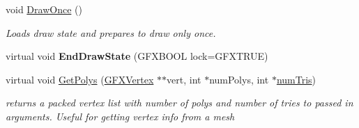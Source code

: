 \begin{DoxyCompactItemize}
\item 
void \hyperlink{classGFXVertexList_a965e59eb121d7ba4a0626cf9b5f0dcc1}{Draw\+Once} ()\hypertarget{classGFXVertexList_a965e59eb121d7ba4a0626cf9b5f0dcc1}{}\label{classGFXVertexList_a965e59eb121d7ba4a0626cf9b5f0dcc1}

\begin{DoxyCompactList}\small\item\em Loads draw state and prepares to draw only once. \end{DoxyCompactList}\item 
virtual void {\bfseries End\+Draw\+State} (G\+F\+X\+B\+O\+OL lock=G\+F\+X\+T\+R\+UE)\hypertarget{classGFXVertexList_a71b8f6132eb44a75a932ca7b6f55c547}{}\label{classGFXVertexList_a71b8f6132eb44a75a932ca7b6f55c547}

\item 
virtual void \hyperlink{classGFXVertexList_a59a08674ffc8cad57e0961b05110333e}{Get\+Polys} (\hyperlink{structGFXVertex}{G\+F\+X\+Vertex} $\ast$$\ast$vert, int $\ast$num\+Polys, int $\ast$\hyperlink{classGFXVertexList_af0ca7d06410f649c6d1d506121c4f6da}{num\+Tris})\hypertarget{classGFXVertexList_a59a08674ffc8cad57e0961b05110333e}{}\label{classGFXVertexList_a59a08674ffc8cad57e0961b05110333e}

\begin{DoxyCompactList}\small\item\em returns a packed vertex list with number of polys and number of tries to passed in arguments. Useful for getting vertex info from a mesh \end{DoxyCompactList}\end{DoxyCompactItemize}
